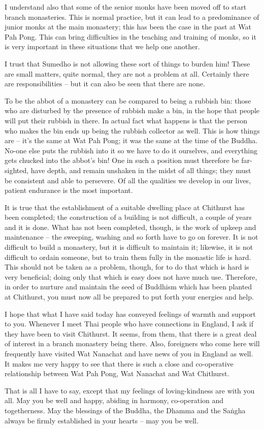 I understand also that some of the senior monks have been moved off to start branch monasteries. This is normal practice, but it can lead to a predominance of junior monks at the main monastery; this has been the case in the past at Wat Pah Pong. This can bring difficulties in the teaching and training of monks, so it is very important in these situations that we help one another.

I trust that Sumedho is not allowing these sort of things to burden him! These are small matters, quite normal, they are not a problem at all. Certainly there are responsibilities -- but it can also be seen that there are none.

To be the abbot of a monastery can be compared to being a rubbish bin: those who are disturbed by the presence of rubbish make a bin, in the hope that people will put their rubbish in there. In actual fact what happens is that the person who makes the bin ends up being the rubbish collector as well. This is how things are -- it's the same at Wat Pah Pong; it was the same at the time of the Buddha. No-one else puts the rubbish into it so we have to do it ourselves, and everything gets chucked into the abbot's bin! One in such a position must therefore be far-sighted, have depth, and remain unshaken in the midst of all things; they must be consistent and able to persevere. Of all the qualities we develop in our lives, patient endurance is the most important.

It is true that the establishment of a suitable dwelling place at Chithurst has been completed; the construction of a building is not difficult, a couple of years and it is done. What has not been completed, though, is the work of upkeep and maintenance -- the sweeping, washing and so forth have to go on forever. It is not difficult to build a monastery, but it is difficult to maintain it; likewise, it is not difficult to ordain someone, but to train them fully in the monastic life is hard. This should not be taken as a problem, though, for to do that which is hard is very beneficial; doing only that which is easy does not have much use. Therefore, in order to nurture and maintain the seed of Buddhism which has been planted at Chithurst, you must now all be prepared to put forth your energies and help.

I hope that what I have said today has conveyed feelings of warmth and support to you. Whenever I meet Thai people who have connections in England, I ask if they have been to visit Chithurst. It seems, from them, that there is a great deal of interest in a branch monastery being there. Also, foreigners who come here will frequently have visited Wat Nanachat and have news of you in England as well. It makes me very happy to see that there is such a close and co-operative relationship between Wat Pah Pong, Wat Nanachat and Wat Chithurst.

That is all I have to say, except that my feelings of loving-kindness are with you all. May you be well and happy, abiding in harmony, co-operation and togetherness. May the blessings of the Buddha, the Dhamma and the Sa\.ngha always be firmly established in your hearts -- may you be well.
